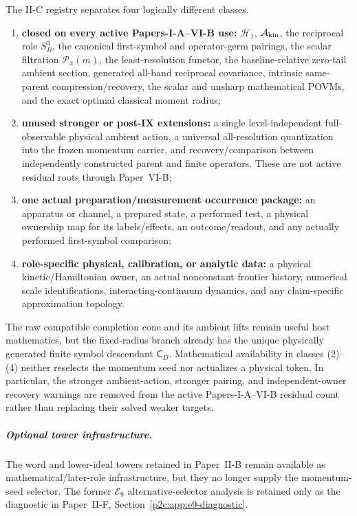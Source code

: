 \documentclass[12pt,a4paper]{article}
\begin{document}
\begin{remark}
\label{p2c:rem:selector-status-classification}
The II-C registry separates four logically different classes.
\begin{enumerate}[label=(\arabic*), leftmargin=2.2em]
\item \textbf{closed on every active Papers-I-A--VI-B use:}
\(\mathcal H_1\), \(\mathcal A_{\rm kin}\), the reciprocal role
\(S^3_B\), the canonical first-symbol and operator-germ pairings, the scalar
filtration \(\mathcal P_x(m)\), the least-resolution functor, the
baseline-relative zero-tail ambient section, generated all-band reciprocal
covariance, intrinsic same-parent compression/recovery, the scalar and
unsharp mathematical POVMs, and the exact optimal classical moment radius;
\item \textbf{unused stronger or post-IX extensions:}
a single level-independent full-observable physical ambient action, a
universal all-resolution quantization into the frozen momentum carrier, and
recovery/comparison between independently constructed parent and finite
operators.  These are not active residual roots through Paper~VI-B;
\item \textbf{one actual preparation/measurement occurrence package:}
an apparatus or channel, a prepared state, a performed test, a physical
ownership map for its labels/effects, an outcome/readout, and any actually
performed first-symbol comparison;
\item \textbf{role-specific physical, calibration, or analytic data:}
a physical kinetic/Hamiltonian owner, an actual nonconstant frontier history,
numerical scale identifications, interacting-continuum dynamics, and any
claim-specific approximation topology.
\end{enumerate}
The raw compatible completion cone and its ambient lifts remain useful host
mathematics, but the fixed-radius branch already has the unique physically
generated finite symbol descendant \(\mathsf C_D\).  Mathematical
availability in classes (2)--(4) neither reselects the momentum seed nor
actualizes a physical token.  In particular, the stronger ambient-action,
stronger pairing, and independent-owner recovery warnings are removed from
the active Papers-I-A--VI-B residual count rather than replacing their solved
weaker targets.
\end{remark}

\subparagraph{Optional tower infrastructure.}
The word and lower-ideal towers retained in Paper~II-B remain available as
mathematical/later-role infrastructure, but they no longer supply the
momentum-seed selector.  The former \(\mathcal E_9\) alternative-selector
analysis is retained only as the diagnostic in
Paper~II-F, Section~\ref{p2c:app:e9-diagnostic}.
\end{document}
